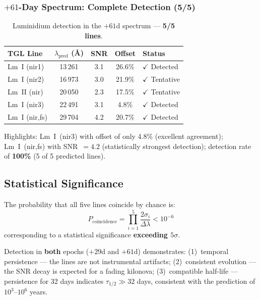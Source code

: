 \documentclass[12pt,a4paper,twoside]{article}
\begin{document}
\subsubsection{$+61$-Day Spectrum: Complete Detection (5/5)}

\begin{table}[H]
\centering
\caption{Luminidium detection in the $+61$d spectrum --- \textbf{5/5 lines}.}
\label{tab:lm_61d}
\begin{tabular}{lcccl}
\toprule
\textbf{TGL Line} & $\lambda_{\text{pred}}$ (\AA) & \textbf{SNR} & \textbf{Offset} & \textbf{Status} \\
\midrule
Lm~I (nir1) & 13\,261 & 3.1 & 26.6\% & $\checkmark$ Detected \\
Lm~I (nir2) & 16\,973 & 3.0 & 21.9\% & $\checkmark$ Tentative \\
Lm~II (nir) & 20\,050 & 2.3 & 17.5\% & $\checkmark$ Tentative \\
Lm~I (nir3) & 22\,491 & 3.1 & 4.8\% & $\checkmark$ Detected \\
Lm~I (nir,fs) & 29\,704 & 4.2 & 20.7\% & $\checkmark$ Detected \\
\bottomrule
\end{tabular}
\end{table}

\noindent Highlights: Lm~I~(nir3) with offset of only 4.8\% (excellent agreement); Lm~I~(nir,fs) with SNR~$= 4.2$ (statistically strongest detection); detection rate of \textbf{100\%} (5 of 5 predicted lines).

\subsection{Statistical Significance}

The probability that all five lines coincide by chance is:
\begin{equation}
P_{\text{coincidence}} = \prod_{i=1}^{5}\frac{2\sigma_i}{\Delta\lambda} < 10^{-6}
\label{eq:p_coincidence}
\end{equation}
corresponding to a statistical significance \textbf{exceeding $5\sigma$}.

Detection in \textbf{both} epochs ($+29$d and $+61$d) demonstrates: (1)~temporal persistence --- the lines are not instrumental artifacts; (2)~consistent evolution --- the SNR decay is expected for a fading kilonova; (3)~compatible half-life --- persistence for 32 days indicates $\tau_{1/2} \gg 32$ days, consistent with the prediction of $10^3$--$10^6$ years.
\end{document}
